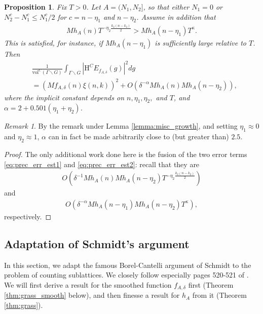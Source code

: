\documentclass[11pt]{amsart}
\newtheorem{proposition}[theorem]{Proposition}
\numberwithin{theorem}{section}
\numberwithin{equation}{section}
\theoremstyle{remark}
\newtheorem*{remark}{Remark}
\theoremstyle{definition}
\newcommand{\vol}{\mathrm{vol}}
\begin{document}
\begin{proposition} \label{prop:prec_err_est}
Fix $T > 0$. Let $A=(N_1,N_2]$, so that either $N_1=0$ or $N_2^c-N_1^c \leq N_1^c/2$ for $c=n-\eta_1$ and $n-\eta_2$. Assume in addition that
\begin{align*}
Mh_A(n)T^{-\eta_2\frac{k_2(n-k_2)}{2}} > Mh_A(n-\eta_1)T^\kappa.
\end{align*}
This is satisfied, for instance, if $Mh_A(n-\eta_1)$ is sufficiently large relative to $T$.
Then
\begin{align*}
&\frac{1}{\vol^C(\Gamma\backslash G)}\int_{\Gamma \backslash G} \left|\mathrm H^CE_{f_{A,\delta}}(g)\right|^2dg \\
&= \left(Mf_{A,\delta}(n)\xi(n,k)\right)^2 + O(\delta^{-\alpha}Mh_A(n)Mh_A(n-\eta_2)),
\end{align*}
where the implicit constant depends on $n, \eta_1, \eta_2,$ and $T$, and $\alpha = 2+0.501(\eta_1+\eta_2)$.
\end{proposition}
\begin{remark}
By the remark under Lemma \ref{lemma:misc_growth}, and setting $\eta_1\approx0$ and $\eta_2\approx1$, $\alpha$ can in fact be made arbitrarily close to (but greater than) $2.5$.
\end{remark}
\begin{proof}
The only additional work done here is the fusion of the two error terms \eqref{eq:prec_err_est1} and \eqref{eq:prec_err_est2}: recall that they are
\begin{align*}
O\left(\delta^{-1}Mh_A(n)Mh_A(n-\eta_2)T^{-\eta_2\frac{k_2(n-k_2)}{2}}\right)
\end{align*}
and
\begin{align*}
O\left(\delta^{-\alpha}Mh_A(n-\eta_1)Mh_A(n-\eta_2)T^\kappa\right),
\end{align*}
respectively.
\end{proof}


\subsection{Adaptation of Schmidt's argument}


In this section, we adapt the famous Borel-Cantelli argument of Schmidt \cite{Sch60} to the problem of counting sublattices. We closely follow especially pages 520-521 of \cite{Sch60}. We will first derive a result for the smoothed function $f_{A,\delta}$ first (Theorem \ref{thm:grass_smooth} below), and then finesse a result for $h_A$ from it (Theorem \ref{thm:grass}).
\end{document}
